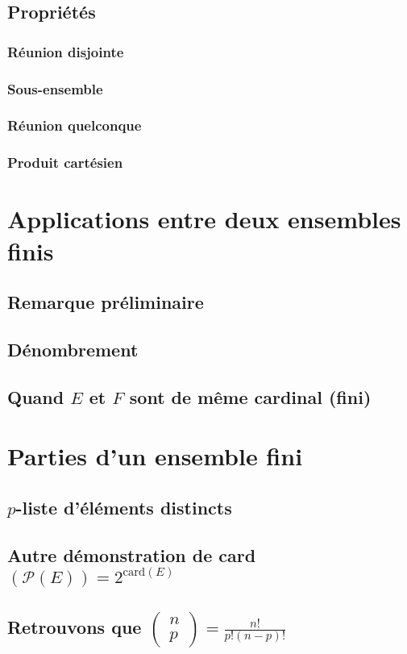 \documentclass[12pt,a4paper,french]{book}
\begin{document}
		\subsection{Propriétés}
			\subsubsection{Réunion disjointe}
			\subsubsection{Sous-ensemble}
			\subsubsection{Réunion quelconque}
			\subsubsection{Produit cartésien}
	\section{Applications entre deux ensembles finis}
		\subsection{Remarque préliminaire}
		\subsection{Dénombrement}
		\subsection{Quand $E$ et $F$ sont de même cardinal (fini)}
	\section{Parties d'un ensemble fini}
		\subsection{$p$-liste d'éléments distincts}
		\subsection{Autre démonstration de card$(\mathcal{P}(E)) = 2^{\mbox{card}(E)}$}
		\subsection{Retrouvons que $\begin{pmatrix}
				n \\ p
			\end{pmatrix} = \frac{n!}{p!(n-p)!}$}
	
	
	
\end{document}
